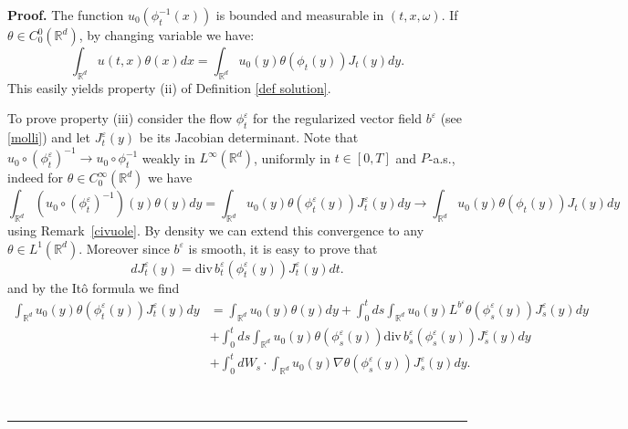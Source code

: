 \documentclass[a4paper,10pt]{article}
\newenvironment{proof}[1][Proof]{\textbf{#1.} }{\ \rule{0.5em}{0.5em}}
\begin{document}
\begin{proof}
The function $u_{0}(\phi_{t}^{-1}(x))$ is bounded and measurable
in $\left( t,x,\omega\right)  $. If $\theta \in C^0_0(\mathbb{R}
^d)$, by changing variable we have:
\[
\int_{{}{\mathbb{R}}^{d}}u(t,x)\theta(x)dx=\int_{{}{\mathbb{R}}^{d}}%
u_{0}(y)\theta(\phi_{t}(y))J_{t}(y)dy .
\]
 This easily yields
property (ii) of Definition \ref{def solution}.

To prove property (iii) consider the flow  $\phi
_{t}^{\varepsilon}$ for the regularized vector field
$b^{\varepsilon}$ (see \eqref{molli}) and let
$J_{t}^{\varepsilon}(y)$ be its Jacobian determinant. Note that
$u_0 \circ (\phi^\varepsilon_t)^{-1} \to u_0 \circ \phi_t^{-1}$
weakly in $L^{\infty}(\mathbb{R}^d)$, uniformly in $t \in [0,T]$
and $P$-a.s., indeed for $\theta \in C_0^\infty(\mathbb{R} ^d)$ we
have
$$
\int_{{}{\mathbb{R}}^{d}} (u_0 \circ (\phi^\varepsilon_t)^{-1}
)(y) \theta(y) dy = \int_{{}{\mathbb{R}}^{d}} u_0(y)
\theta(\phi^{\varepsilon}_t(y)) J_t^\varepsilon(y) dy \to
\int_{{}{\mathbb{R}}^{d}} u_0(y) \theta(\phi_t(y)) J_t(y) dy
$$
using Remark~\ref{civuole}. By density we can extend this
convergence to any $\theta \in L^1(\mathbb{R} ^d)$. Moreover since
$b^{\varepsilon}$ is smooth, it is easy to prove that
\[
dJ_{t}^{\varepsilon}(y)={\mathrm{div}\,}b^{\varepsilon}_t(\phi_{t}^{\varepsilon
}(y))J_{t}^{\varepsilon}(y)dt.
\]
and by the It\^o formula we find
\begin{equation} \label{ii}
\begin{split}
\int_{{\mathbb{R}}^{d}}u_{0}(y)\theta(\phi_{t}^\varepsilon
(y))J_{t}^\varepsilon (y)dy  &
=\int_{{\mathbb{R}}^{d}}u_{0}(y)\theta(y)dy+\int_{0}^{t}ds\int_{{\mathbb{R}%
}^{d}}u_{0}(y)L^{b^\varepsilon}\theta(\phi_{s}^\varepsilon (y))J_{s}^\varepsilon(y)dy\\
&
+\int_{0}^{t}ds\int_{{\mathbb{R}}^{d}}u_{0}(y)\theta(\phi_{s}^\varepsilon
(y)){\mathrm{div}\, }b^\varepsilon_s
(\phi_{s}^\varepsilon(y))J_{s}^\varepsilon(y)dy\\
&
+\int_{0}^{t}dW_{s}\cdot\int_{{\mathbb{R}}^{d}}u_{0}(y)\nabla\theta
(\phi_{s}^\varepsilon(y))J_{s}^\varepsilon(y)dy.
\end{split}
\end{equation}


\end{proof}
\end{document}
